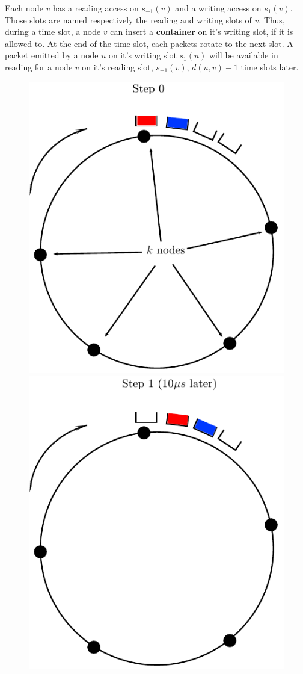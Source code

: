\documentclass[a4paper,10pt,french,english]{article}
\begin{document}
  Each node $v$ has a reading access on $s_{-1}(v)$ and a writing access on $s_{1}(v)$. Those slots are named respectively the reading and writing slots of $v$. Thus, during a time slot, a node $v$ can insert a {\bf container} on it's writing slot, if it is allowed to. At the end of the time slot, each packets rotate to the next slot. A packet emitted by a node $u$ on it's writing slot $s_1(u)$ will be available in reading for a node $v$ on it's reading slot, $s_{-1}(v)$, $d(u,v) -1$  time slots later.
\begin{figure}[h!]
      \includegraphics[scale=0.5]{anneau1.pdf}
      \hspace{3cm}
      \includegraphics[scale=0.5]{anneau2.pdf}

\end{figure}
\end{document}
